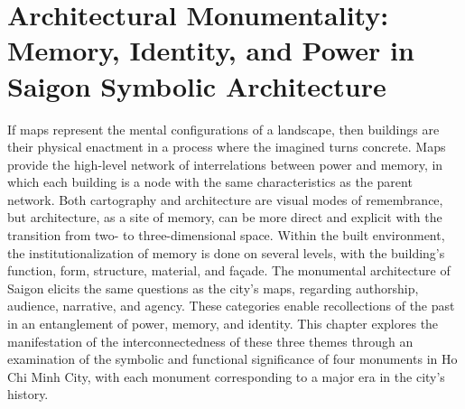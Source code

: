 \chapter[Architectural Monumentality]{Architectural Monumentality: Memory, Identity, and Power in Saigon Symbolic Architecture}\label{symbol}
If maps represent the mental configurations of a landscape, then buildings are their physical enactment in a process where the imagined turns concrete. Maps provide the high-level network of interrelations between power and memory, in which each building is a node with the same characteristics as the parent network. Both cartography and architecture are visual modes of remembrance, but architecture, as a site of memory, can be more direct and explicit with the transition from two- to three-dimensional space. Within the built environment, the institutionalization of memory is done on several levels, with the building’s function, form, structure, material, and façade. The monumental architecture of Saigon elicits the same questions as the city’s maps, regarding authorship, audience, narrative, and agency. These categories enable recollections of the past in an entanglement of power, memory, and identity. This chapter explores the manifestation of the interconnectedness of these three themes through an examination of the symbolic and functional significance of four monuments in Ho Chi Minh City, with each monument corresponding to a major era in the city’s history.
\vi

